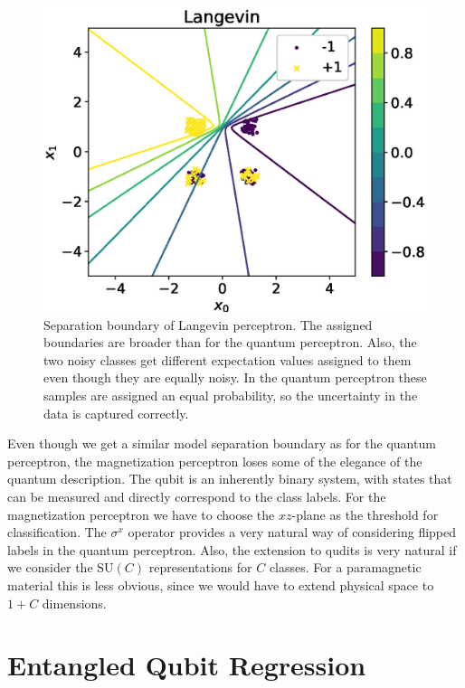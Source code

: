 \begin{figure}[htb!]
    \centering
    \includegraphics[width = \textwidth]{figures/chapter3/langevin_lh.eps}
    \caption{Separation boundary of Langevin perceptron. The assigned boundaries are broader than for the quantum perceptron. Also, the two noisy classes get different expectation values assigned to them even though they are equally noisy. In the quantum perceptron these samples are assigned an equal probability, so the uncertainty in the data is captured correctly.}
    \label{fig:langevin_lh}
\end{figure}

\noindent Even though we get a similar model separation boundary as for the quantum perceptron, the magnetization perceptron loses some of the elegance of the quantum description. The qubit is an inherently binary system, with states that can be measured and directly correspond to the class labels. For the magnetization perceptron we have to choose the $xz$-plane as the threshold for classification. The $\sigma^x$ operator provides a very natural way of considering flipped labels in the quantum perceptron. Also, the extension to qudits is very natural if we consider the $\text{SU}(C)$ representations for $C$ classes. For a paramagnetic material this is less obvious, since we would have to extend physical space to $1 + C$ dimensions. 

\section{Entangled Qubit Regression} \label{sec:qubit_ent}

